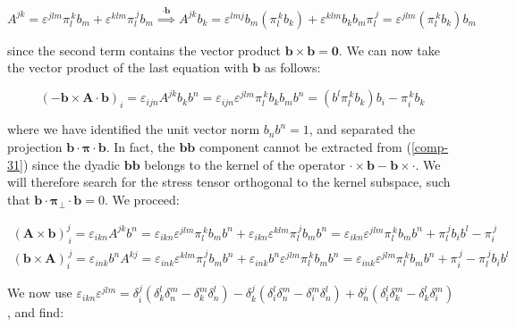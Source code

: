 \begin{equation*}
    A^{jk}=\varepsilon^{jlm}\pi_{l}^{\,k}b_m+\varepsilon^{klm}\pi_{l}^{\,j}b_m\stackrel{\cdot \mathbf{b}}{\implies}A^{jk}b_k=\varepsilon^{lmj}b_m \left(\pi_l^{\,k}b_k\right)+\varepsilon^{klm}b_k b_m\pi_l^{\,j}=\varepsilon^{jlm}\left(\pi_l^{\,k}b_k\right) b_m
\end{equation*}

since the second term contains the vector product $\mathbf{b}\times \mathbf{b}=\mathbf{0}$. We can now take the vector product of the last equation with $\mathbf{b}$ as follows:

\begin{equation*}
    \left(-\mathbf{b}\times \mathbf{A}\cdot \mathbf{b}\right)_i=\varepsilon_{ijn}A^{jk}b_kb^n=\varepsilon_{ijn}\varepsilon^{jlm}\pi_l^{\,k}b_k b_mb^n=\left(b^l\pi_l^{\,k}b_k\right)b_i-\pi_i^{\,k}b_k
\end{equation*}

where we have identified the unit vector norm $b_nb^n=1$, and separated the projection $\mathbf{b}\cdot\boldsymbol{\pi}\cdot \mathbf{b}$. In fact, the $\mathbf{b}\mathbf{b}$ component cannot be extracted from (\ref{comp-31}) since the dyadic $\mathbf{b}\mathbf{b}$ belongs to the kernel of the operator $\cdot\times \mathbf{b}-\mathbf{b}\times\cdot$. We will therefore search for the stress tensor orthogonal to the kernel subspace, such that $\mathbf{b}\cdot\boldsymbol{\pi}_\perp\cdot \mathbf{b}=0$. We proceed:

\begin{gather*}
    \left(\mathbf{A}\times \mathbf{b}\right)^{j}_{\,i}=\varepsilon_{ikn}A^{jk}b^n=\varepsilon_{ikn}\varepsilon^{jlm}\pi_{l}^{\,k}b_m b^n+\varepsilon_{ikn}\varepsilon^{klm}\pi_{l}^{\,j}b_mb^n=\varepsilon_{ikn}\varepsilon^{jlm}\pi_l^{\,k} b_mb^n+\pi_l^{\,j}b_ib^l-\pi_i^{\,j}\\
    \left(\mathbf{b}\times \mathbf{A}\right)_{i}^{\,j}=\varepsilon_{ink}b^nA^{kj}=\varepsilon_{ink}\varepsilon^{klm}\pi_l^{\,j}b_mb^n+\varepsilon_{ink}b^n \varepsilon^{jlm}\pi_l^{\,k}b_mb^n=\varepsilon_{ink}\varepsilon^{jlm}\pi_l^{\,k}b_mb^n+\pi_i^{\,j}-\pi_l^{\,j}b_ib^l
\end{gather*}

We now use $\varepsilon_{ikn}\varepsilon^{jlm} = \delta_i^j(\delta_k^l\delta_n^m - \delta_k^m\delta_n^l) - \delta_k^j(\delta_i^l\delta_n^m - \delta_i^m\delta_n^l) + \delta_n^j(\delta_i^l\delta_k^m - \delta_k^l\delta_i^m)$, and find:

